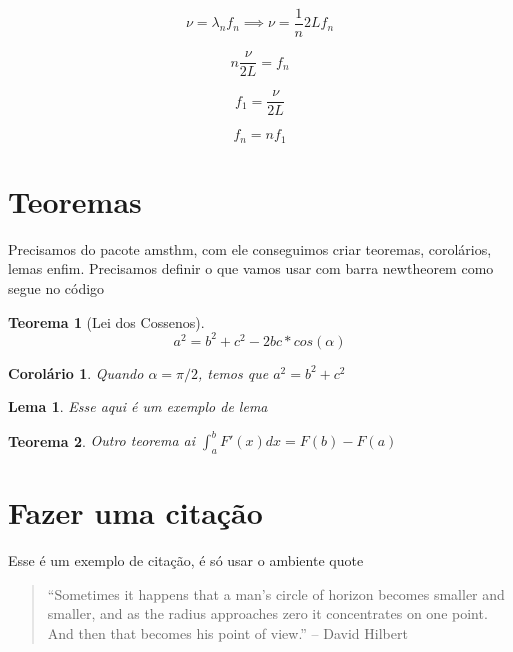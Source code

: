 \documentclass[a4paper]{article}
\begin{document}
\begin{equation*}
    \nu = \lambda_n f_n \implies \nu = \frac{1}{n} 2L f_n
\end{equation*}

\begin{equation*}
    n \frac{\nu}{2L} = f_n
\end{equation*}

\begin{equation}
    \label{eqn:modo_fundamental}
    f_1 = \frac{\nu}{2L}
\end{equation}

\begin{equation}
    \label{eqn:f_n}
    f_n =  n f_1
\end{equation}
\section{Teoremas}
Precisamos do pacote amsthm, com ele conseguimos criar teoremas, corolários, lemas enfim. Precisamos definir o que vamos usar com barra newtheorem como segue no código

\newtheorem{theorem}{Teorema}
\newtheorem{corollary}{Corolário}
\newtheorem{Lemma}{Lema}
\begin{theorem}[Lei dos Cossenos]
$$a^2=b^2+c^2 -2bc*cos(\alpha)$$
\end{theorem}


\begin{corollary}
Quando $\alpha=\pi/2$, temos que $a^2=b^2+c^2$
\end{corollary}

\begin{Lemma}
Esse aqui é um exemplo de lema
\end{Lemma}

\begin{theorem}
    Outro teorema ai 
 $\int_{a}^{b}F'(x)dx=F(b)-F(a)$
\end{theorem}
\section{Fazer uma citação}
Esse é um exemplo de citação, é só usar o ambiente quote
\begin{quote}
    “Sometimes it happens that a man's circle of horizon becomes smaller and smaller, and as the radius approaches zero it concentrates on one point. And then that becomes his point of view.” -- David Hilbert
\end{quote}
\end{document}
